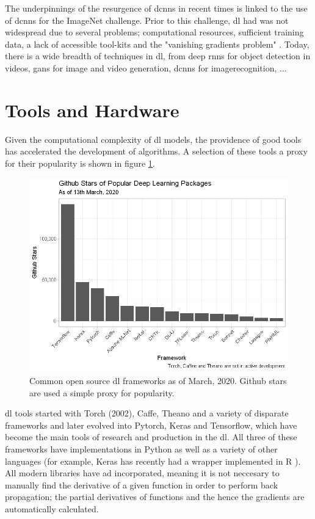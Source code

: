 The underpinnings of the resurgence of \gls{dcnn}s in recent times is linked to the use of \gls{dcnn}s for the ImageNet challenge. Prior to this challenge, \gls{dl} had was not widespread due to several problems; computational resources, sufficient training data, a lack of accessible tool-kits and the "vanishing gradients problem" \cite[Chapter~8]{good_fellow_2016} \cite[p.~93-94]{dl_overview}. Today, there is a wide breadth of techniques in \gls{dl}, from deep \gls{rnn}s for object detection in videos, \gls{gan}s for image and video generation, \gls{dcnn}s for \gls{imagerecognition}, ... 


\section{Tools and Hardware}

Given the computational complexity of  \gls{dl} models, the providence of good tools has accelerated the development of algorithms. A selection of these tools a proxy for their popularity is shown in figure \ref{fig:git_stars}.

\begin{figure}
    \centering
    \includegraphics[width=120mm]{figs/gitstars.png}
    \caption[Popular \gls{dl} frameworks]{Common open source \gls{dl} frameworks as of March, 2020. Github stars are used a simple proxy for popularity.}
    \label{fig:git_stars}
\end{figure}

\gls{dl} tools started with Torch (2002), Caffe, Theano and a variety of disparate frameworks and later evolved into Pytorch, Keras and Tensorflow, which have become the main tools of research and production in the \gls{dl}. All three of these frameworks have implementations in Python as well as a variety of other languages (for example, Keras has recently had a wrapper implemented in R \cite{keras_r}). All modern libraries have \gls{ad} incorporated, meaning it is not neccesary to manually find the derivative of a given function in order to perform back propagation; the partial derivatives of functions and the hence the gradients are automatically calculated.  \bigskip

